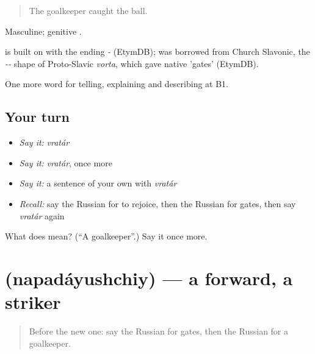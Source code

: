 \begin{quote}
The goalkeeper caught the ball.
\end{quote}

Masculine; genitive .

\begin{cousinweb}
\emph{} is built on \emph{} with the ending \emph{-} (EtymDB); \emph{} was borrowed from Church Slavonic, the \emph{--} shape of Proto-Slavic \emph{vorta}, which gave native \emph{} 'gates' (EtymDB).
\end{cousinweb}

\begin{grammarlens}[title={What you've built}]
One more word for telling, explaining and describing at B1.
\end{grammarlens}

\subsection*{Your turn}
\begin{itemize}
\raggedright
  \item \emph{Say it:} \emph{vratár}
  \item \emph{Say it:} \emph{vratár}, once more
  \item \emph{Say it:} a sentence of your own with \emph{vratár}
  \item \emph{Recall:} say the Russian for to rejoice, then the Russian for gates, then say \emph{vratár} again
\end{itemize}

\begin{tcolorbox}[breakable,colback=teal!4,colframe=teal!35!black,title={Before you move on}]
What does  mean? (\textquotedblleft{}A goalkeeper\textquotedblright{}.) Say it once more.
\end{tcolorbox}
\section[\texorpdfstring{\ru{нападающий} (napadáyushchiy)}{нападающий (napadáyushchiy)}]{ (napadáyushchiy) — a forward, a striker}

\label{lesson:RU-C509-napadayushchiy}



\begin{quote}
Before the new one: say the Russian for gates, then the Russian for a goalkeeper.
\end{quote}

